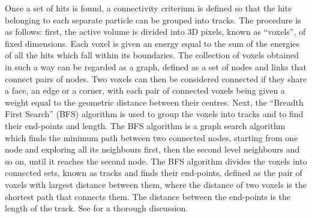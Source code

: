 \documentclass[a4paper,11pt]{article}
\begin{document}
Once a set of hits is found, a connectivity criterium is  defined so that the hits belonging to each separate particle can be grouped into tracks. The procedure is as follows: first, the active volume is divided into 3D pixels, known as ``voxels'', of fixed dimensions. Each voxel is given an energy equal to the sum of the energies of all the hits which fall within its boundaries. The collection of voxels obtained in such a way can be regarded as a graph, defined as a set of nodes and links that connect pairs of nodes. Two voxels can then be considered connected if they share a face, an edge or a corner, with each pair of connected voxels being given a weight equal to the geometric distance between their centres. Next, the ``Breadth First Search'' (BFS) algorithm  is used to group the voxels into tracks and to find their end-points and length. The BFS algorithm is a graph search algorithm which finds the minimum path between two connected nodes, starting from one node and exploring all its neighbours first, then the second level neighbours and so on, until it reaches the second node. The BFS algorithm divides the voxels into connected sets, known as tracks and finds their end-points, defined as the pair of voxels with largest distance between them, where the distance of two voxels is the shortest path that connects them. The distance between the end-points is the length of the track. See \cite{NEXT_topology} for a thorough discussion.
\end{document}
